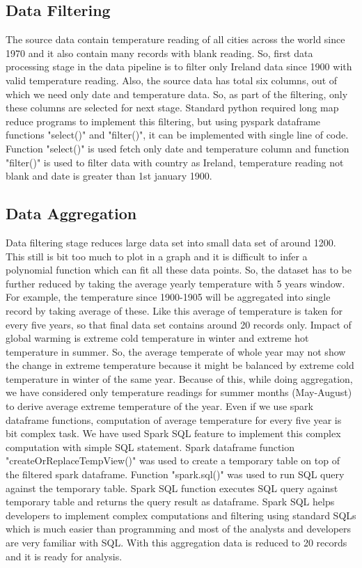 \documentclass[journal,twoside,web]{ieeecolor}
\begin{document}
\subsection{Data Filtering}
The source data contain temperature reading of all cities across the world since 1970 and it also contain many records with blank reading.  So, first data processing stage in the data pipeline is to filter only Ireland data since 1900 with valid temperature reading.  Also, the source data has total six columns, out of which we need only date and temperature data. So, as part of the filtering, only these columns are selected for next stage.  Standard python required long map reduce programs to implement this filtering, but using pyspark dataframe functions "select()" and "filter()", it can be implemented with single line of code.  Function "select()" is used fetch only date and temperature column and function "filter()" is used to filter data with country as Ireland, temperature reading not blank and date is greater than 1st january 1900.

\subsection{Data Aggregation}
Data filtering stage reduces large data set into small data set of around 1200.  This still is bit too much to plot in a graph and it is difficult to infer a polynomial function which can fit all these data points.  So, the dataset has to be further reduced by taking the average yearly temperature with 5 years window.  For example, the temperature since 1900-1905 will be aggregated into single record by taking average of these.  Like this average of temperature is taken for every five years, so that final data set contains around 20 records only.  Impact of global warming is extreme cold temperature in winter and extreme hot temperature in summer.  So, the average temperate of whole year may not show the change in extreme temperature because it might be balanced by extreme cold temperature in winter of the same year.  Because of this, while doing aggregation, we have considered only temperature readings for summer months (May-August) to derive average extreme temperature of the year.  Even if we use spark dataframe functions, computation of average temperature for every five year is bit complex task.  We have used Spark SQL feature to implement this complex computation with simple SQL statement.  Spark dataframe function "createOrReplaceTempView()" was used to create a temporary table on top of the filtered spark dataframe.  Function "spark.sql()" was used to run SQL query against the temporary table.  Spark SQL function executes SQL query against temporary table and returns the query result as dataframe.  Spark SQL helps developers to implement complex computations and filtering using standard SQLs which is much easier than programming and most of the analysts and developers are very familiar with SQL.  With this aggregation data is reduced to 20 records and it is ready for analysis.
\end{document}
